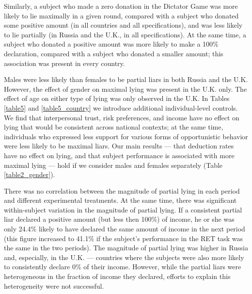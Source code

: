 \documentclass[12pt]{article}
\begin{document}
\par Similarly, a subject who made a zero donation in the Dictator Game was more likely to lie maximally in a given round, compared with a subject who donated some positive amount (in all countries and all specifications), and was less likely to lie partially (in Russia and the U.K., in all specifications). At the same time, a subject who donated a positive amount was more likely to make a 100\% declaration, compared with a subject who donated a smaller amount; this association was present in every country. 

\par Males were less likely than females to be partial liars in both Russia and the U.K. However, the effect of gender on maximal lying was present in the U.K. only. The effect of age on either type of lying was only observed in the U.K. In Tables \ref{table5} and \ref{table5_country} we introduce additional individual-level controls. We find that interpersonal trust, risk preferences, and income have no effect on lying that would be consistent across national contexts; at the same time, individuals who expressed less support for various forms of opportunistic behavior were less likely to be maximal liars.\footnotemark{}
 Our main results --- that deduction rates have no effect on lying, and that subject performance is associated with more maximal lying --- hold if we consider males and females separately (Table \ref{table2_gender}). 

\par There was no correlation between the magnitude of partial lying in each period and different experimental treatments. At the same time, there was significant within-subject variation in the magnitude of partial lying. If a consistent partial liar declared a positive amount (but less then 100\%) of income, he or she was only 24.4\% likely to have declared the same amount of income in the next period (this figure increased to 41.1\% if the subject's performance in the RET task was the same in the two periods). The magnitude of partial lying was higher in Russia and, especially, in the U.K. --- countries where the subjects were also more likely to consistently declare 0\% of their income. However, while the partial liars were heterogeneous in the fraction of income they declared, efforts to explain this heterogeneity were not successful.\footnotemark{}
\label{stata:declared_same}
\end{document}

